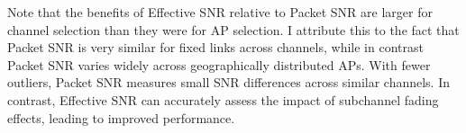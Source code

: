 Note that
the benefits of Effective SNR relative to Packet SNR are larger for channel selection than they were for AP selection. I attribute this to the fact that Packet SNR is very similar for fixed links across channels, while in contrast Packet SNR varies widely across geographically distributed APs. With fewer outliers, Packet SNR measures small SNR differences across similar channels. In contrast, Effective SNR can accurately assess the impact of subchannel fading effects, leading to improved performance.

%
%
%
